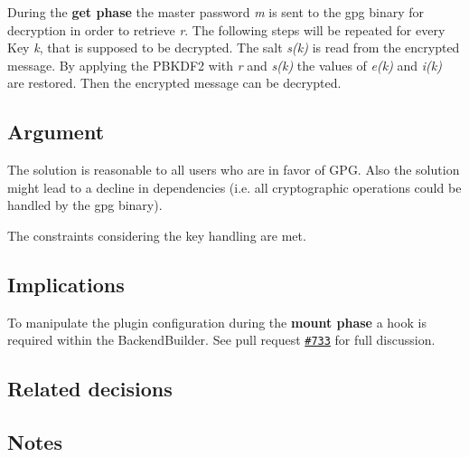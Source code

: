 During the {\bfseries get phase} the master password {\itshape m} is sent to the gpg binary for decryption in order to retrieve {\itshape r}. The following steps will be repeated for every Key {\itshape k}, that is supposed to be decrypted. The salt {\itshape s(k)} is read from the encrypted message. By applying the P\+B\+K\+D\+F2 with {\itshape r} and {\itshape s(k)} the values of {\itshape e(k)} and {\itshape i(k)} are restored. Then the encrypted message can be decrypted.

\subsection*{Argument}

The solution is reasonable to all users who are in favor of G\+PG. Also the solution might lead to a decline in dependencies (i.\+e. all cryptographic operations could be handled by the gpg binary).

The constraints considering the key handling are met.

\subsection*{Implications}

To manipulate the plugin configuration during the {\bfseries mount phase} a hook is required within the {\ttfamily Backend\+Builder}. See pull request \href{https://github.com/ElektraInitiative/libelektra/pull/733}{\tt \#733} for full discussion.

\subsection*{Related decisions}

\subsection*{Notes}